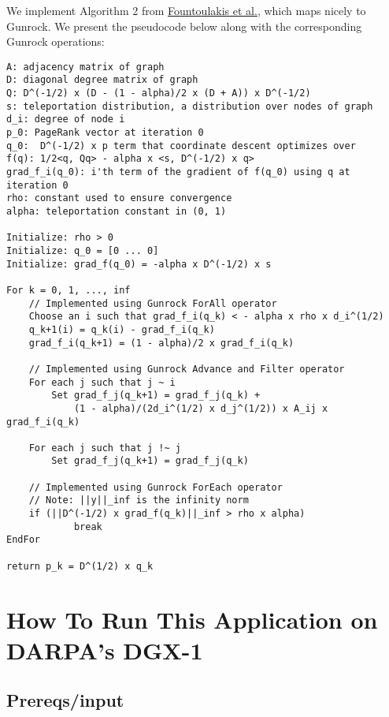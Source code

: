 \documentclass[10pt,oneside]{memoir}
\begin{document}
We implement Algorithm 2 from
\href{https://arxiv.org/pdf/1602.01886.pdf}{Fountoulakis et al.}, which
maps nicely to Gunrock. We present the pseudocode below along with the
corresponding Gunrock operations:

\begin{verbatim}
A: adjacency matrix of graph
D: diagonal degree matrix of graph
Q: D^(-1/2) x (D - (1 - alpha)/2 x (D + A)) x D^(-1/2)
s: teleportation distribution, a distribution over nodes of graph
d_i: degree of node i
p_0: PageRank vector at iteration 0
q_0:  D^(-1/2) x p term that coordinate descent optimizes over
f(q): 1/2<q, Qq> - alpha x <s, D^(-1/2) x q>
grad_f_i(q_0): i'th term of the gradient of f(q_0) using q at iteration 0
rho: constant used to ensure convergence
alpha: teleportation constant in (0, 1)

Initialize: rho > 0
Initialize: q_0 = [0 ... 0]
Initialize: grad_f(q_0) = -alpha x D^(-1/2) x s

For k = 0, 1, ..., inf
    // Implemented using Gunrock ForAll operator
    Choose an i such that grad_f_i(q_k) < - alpha x rho x d_i^(1/2)
    q_k+1(i) = q_k(i) - grad_f_i(q_k)
    grad_f_i(q_k+1) = (1 - alpha)/2 x grad_f_i(q_k)

    // Implemented using Gunrock Advance and Filter operator
    For each j such that j ~ i
        Set grad_f_j(q_k+1) = grad_f_j(q_k) +
            (1 - alpha)/(2d_i^(1/2) x d_j^(1/2)) x A_ij x grad_f_i(q_k)

    For each j such that j !~ j
        Set grad_f_j(q_k+1) = grad_f_j(q_k)

    // Implemented using Gunrock ForEach operator
    // Note: ||y||_inf is the infinity norm
    if (||D^(-1/2) x grad_f(q_k)||_inf > rho x alpha)
            break
EndFor

return p_k = D^(1/2) x q_k
\end{verbatim}

\hypertarget{how-to-run-this-application-on-darpas-dgx-1-5}{%
\section{How To Run This Application on DARPA's
DGX-1}\label{how-to-run-this-application-on-darpas-dgx-1-5}}

\hypertarget{prereqsinput-4}{%
\subsection{Prereqs/input}\label{prereqsinput-4}}
\end{document}
